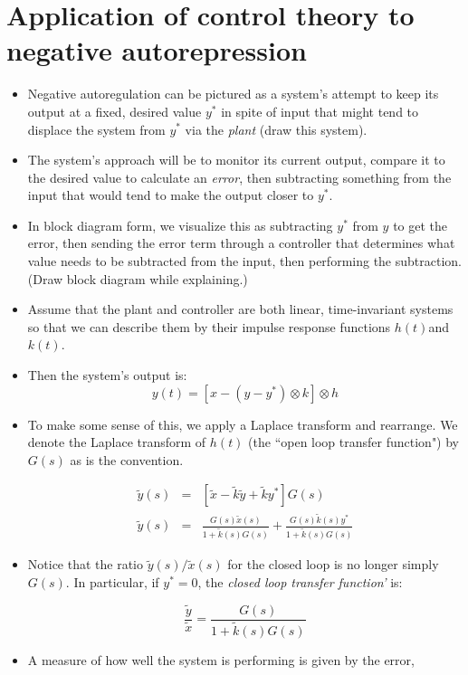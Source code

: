 \documentclass{article}
\begin{document}
\section*{Application of control theory to negative autorepression}
\begin{itemize}
\item Negative autoregulation can be pictured as a system's attempt to keep its output at a fixed, desired value $y^*$ in spite of input that might tend to displace the system from $y^*$ via the \textit{plant} (draw this system).
\item The system's approach will be to monitor its current output, compare it to the desired value to calculate an \textit{error}, then subtracting something from the input that would tend to make the output closer to $y^*$.
\item In block diagram form, we visualize this as subtracting $y^*$ from $y$ to get the error, then sending the error term through a controller that determines what value needs to be subtracted from the input, then performing the subtraction. (Draw block diagram while explaining.)
\item Assume that the plant and controller are both linear, time-invariant systems so that we can describe them by their impulse response functions $h(t)$and $k(t)$.
\item Then the system's output is:
\[ y(t) = \left[ x - \left(y - y^*\right) \otimes k \right] \otimes h \]
\item To make some sense of this, we apply a Laplace transform and rearrange. We denote the Laplace transform of $h(t)$ (the ``open loop transfer function") by $G(s)$ as is the convention.

\begin{eqnarray*}
 \tilde{y}(s) & = & \left[ \tilde{x} - \tilde{k} \tilde{y} + \tilde{k} y^* \right] G(s)\\
 \tilde{y}(s) & =& \frac{G(s) \tilde{x}(s)}{1 + \tilde{k}(s) G(s)} +  \frac{G(s) \tilde{k}(s)  y^* }{1 + \tilde{k}(s) G(s)}
\end{eqnarray*}

\item Notice that the ratio $\tilde{y}(s)/\tilde{x}(s)$ for the closed loop is no longer simply $G(s)$. In particular, if $y^*=0$, the \textit{closed loop transfer function'} is:

\[ \frac{\tilde{y}}{\tilde{x}} =  \frac{G(s)}{1 + \tilde{k}(s) G(s)} \]

\item A measure of how well the system is performing is given by the error,


\end{itemize}
\end{document}
